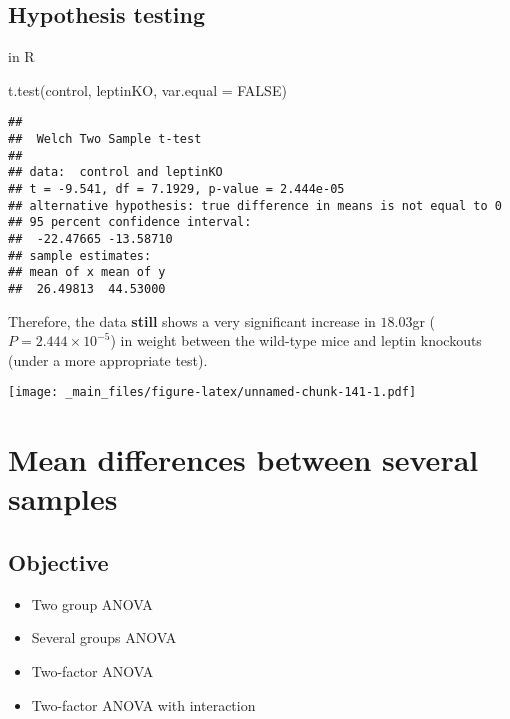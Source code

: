 \documentclass[
]{book}
\newenvironment{Shaded}{\begin{snugshade}}{\end{snugshade}}
\newcommand{\AttributeTok}[1]{\textcolor[rgb]{0.77,0.63,0.00}{#1}}
\newcommand{\ConstantTok}[1]{\textcolor[rgb]{0.00,0.00,0.00}{#1}}
\newcommand{\FunctionTok}[1]{\textcolor[rgb]{0.00,0.00,0.00}{#1}}
\newcommand{\NormalTok}[1]{#1}
\providecommand{\tightlist}{%
  \setlength{\itemsep}{0pt}\setlength{\parskip}{0pt}}
\begin{document}
\hypertarget{hypothesis-testing-5}{%
\section{Hypothesis testing}\label{hypothesis-testing-5}}

in R

\begin{Shaded}
\begin{Highlighting}[]
\FunctionTok{t.test}\NormalTok{(control, leptinKO, }\AttributeTok{var.equal =} \ConstantTok{FALSE}\NormalTok{)}
\end{Highlighting}
\end{Shaded}

\begin{verbatim}
## 
##  Welch Two Sample t-test
## 
## data:  control and leptinKO
## t = -9.541, df = 7.1929, p-value = 2.444e-05
## alternative hypothesis: true difference in means is not equal to 0
## 95 percent confidence interval:
##  -22.47665 -13.58710
## sample estimates:
## mean of x mean of y 
##  26.49813  44.53000
\end{verbatim}

Therefore, the data \textbf{still} shows a very significant increase in \(18.03\)gr (\(P=2.444 \times 10^{-5}\)) in weight between the wild-type mice and leptin knockouts (under a more appropriate test).

\texttt{[image: \_main\_files/figure-latex/unnamed-chunk-141-1.pdf]}

\hypertarget{mean-differences-between-several-samples}{%
\chapter{Mean differences between several samples}\label{mean-differences-between-several-samples}}

\hypertarget{objective-16}{%
\section{Objective}\label{objective-16}}

\begin{itemize}
\tightlist
\item
  Two group ANOVA
\item
  Several groups ANOVA
\item
  Two-factor ANOVA
\item
  Two-factor ANOVA with interaction
\end{itemize}
\end{document}
